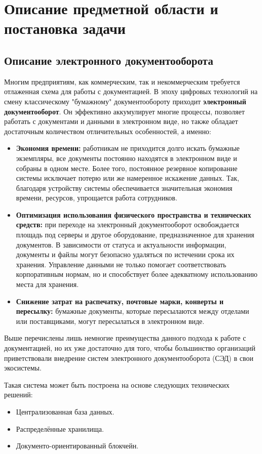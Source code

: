 \chapter{Описание предметной области и постановка задачи} \label{ch:ch1}

\section{Описание электронного документооборота} \label{sec:ch1/sec1}
Многим предприятиям, как коммерческим, так и некоммерческим требуется отлаженная схема для работы с документацией.
В эпоху цифровых технологий на смену классическому "бумажному" документообороту приходит \textbf{электронный документооборот}.
Он эффективно аккумулирует многие процессы, позволяет работать с документами и данными в электронном виде, но также обладает достаточным количеством отличительных особенностей, а именно:
 \begin{itemize}
 	\item \textbf{Экономия времени:} работникам не приходится долго искать бумажные экземпляры, все документы постоянно находятся в электронном виде и собраны в одном месте. Более того, постоянное резервное копирование системы исключает потерю или же намеренное искажение данных. Так, благодаря устройству системы обеспечивается значительная экономия времени, ресурсов, упрощается работа сотрудников.
 	\item \textbf{Оптимизация использования физического пространства и технических средств:} при переходе на электронный документооборот освобождается площадь под серверы и другое оборудование, предназначенное для хранения документов. В зависимости от статуса и актуальности информации, документы и файлы могут безопасно удаляться по истечении срока их хранения. Управление данными не только помогает соответствовать корпоративным нормам, но и способствует более адекватному использованию места для хранения.
 	\item \textbf{Снижение затрат на распечатку, почтовые марки, конверты и пересылку:} бумажные документы, которые пересылаются между отделами или поставщиками, могут пересылаться в электронном виде.
 \end{itemize}

Выше перечислены лишь немногие преимущества данного подхода к работе с документацией, но их уже достаточно для того, чтобы большинство организаций приветствовали внедрение 	систем электронного документооборота (СЭД) в свои экосистемы.

Такая система может быть построена на основе следующих технических решений:
\begin{itemize}
	\item Централизованная база данных.
	\item Распределённые хранилища.
	\item Документо-ориентированный блокчейн.
\end{itemize}
